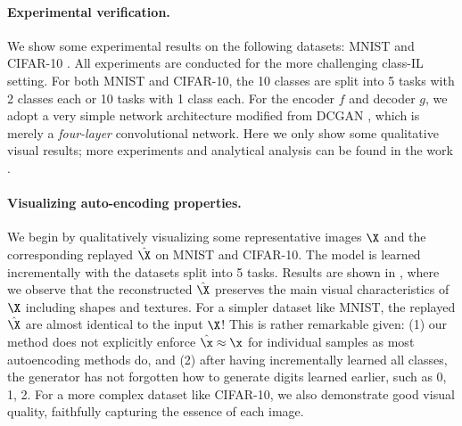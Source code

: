 \documentclass[../../book-main.tex]{subfiles}
\begin{document}
\paragraph{Experimental verification.}
We show some experimental results on the following datasets: MNIST \cite{lecun1998gradient} and CIFAR-10 \cite{krizhevsky2014cifar}. All experiments are conducted for the more challenging class-IL setting. For both MNIST and CIFAR-10, the 10 classes are split into 5 tasks with 2 classes each or 10 tasks with 1 class each. For the encoder $f$ and decoder $g$, we adopt a very simple network architecture modified from DCGAN \cite{radford2016unsupervised}, which is merely a {\em four-layer} convolutional network. Here we only show some qualitative visual results; more experiments and analytical analysis can be found in the work \cite{tong2023incremental}.

\paragraph{Visualizing auto-encoding properties.}
We begin by qualitatively visualizing some representative images $\X$ and the corresponding replayed $\hat{\X}$ on MNIST and CIFAR-10. The model is learned incrementally with the datasets split into 5 tasks. Results are shown in , where we observe that the reconstructed $\hat{\X}$ preserves the main visual characteristics of $\X$ including shapes and textures. For a simpler dataset like MNIST, the replayed $\hat{\X}$ are almost identical to the input $\X$! This is rather remarkable given: (1) our method does not explicitly enforce $\hat{\x} \approx \x$ for individual samples as most autoencoding methods do, and (2) after having incrementally learned all classes, the generator has not forgotten how to generate digits learned earlier, such as 0, 1, 2.  For a more complex dataset like CIFAR-10, we also demonstrate good visual quality, faithfully capturing the essence of each image.
\end{document}
